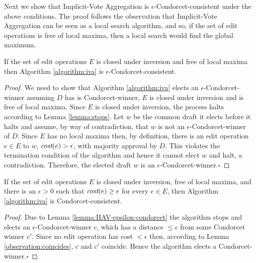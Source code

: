 \documentclass[sigconf]{aamas}  %
\newcommand{\qqed}{\hfill$\square$}
\newcommand{\cost}{\emph{cost}}
\begin{document}
Next we show that Implicit-Vote Aggregation is $\epsilon$-Condorcet-consistent under the above conditions. The proof follows the observation that Implicit-Vote Aggregation can be seen as a local search algorithm, and so, if the set of edit operations is free of local maxima, then a local search would find the global maximum.

\begin{lemma}\label{lemma:IIAV-epsilon-condorcet}
If the set of edit operations $E$ is closed under inversion and free of local maxima then Algorithm \ref{algorithm:iva} is $\epsilon$-Condorcet-consistent.
\end{lemma}

\begin{proof}
%
We need to show that Algorithm \ref{algorithm:iva} elects an $\epsilon$-Condorcet-winner assuming $D$ has is Condorcet-winner,  $E$ is closed under inversion and is free of local maxima.
Since $E$ is closed under inversion, the process halts according to Lemma \ref{lemma:stops}.  Let $w$ be the common draft it elects before it halts and assume, by way of contradiction, that $w$ is not an $\epsilon$-Condorcet-winner of $D$.  Since $E$ has no local maxima then, by definition, there is an edit operation $e \in E$ to $w$, $\cost(e) > \epsilon$, with majority approval by $D$.  This violates the termination condition of the algorithm and hence it cannot elect $w$ and halt, a contradiction.   Therefore, the elected draft $w$ is an $\epsilon$-Condorcet-winner.\qqed
%
\end{proof}

\begin{corollary}\label{corollary:IIAV--condorcet}
If the set of edit operations $E$ is closed under inversion, free of local maxima, and there is an $\epsilon > 0$ such that $\cost(e) \ge \epsilon$ for every $e \in E$, then Algorithm \ref{algorithm:iva} is Condorcet-consistent.
\end{corollary}

\begin{proof}
%
Due to Lemma \ref{lemma:IIAV-epsilon-condorcet} the algorithm stops and elects an $\epsilon$-Condorcet-winner $c$, which has a distance $\le \epsilon$ from some Condorcet winner $c'$.
Since no edit operation has cost $< \epsilon$ then, according to Lemma \ref{observation:coincides}, $c$ and $c'$ coincide.  Hence the algorithm elects a Condorcet-winner.\qqed
%
\end{proof}
\end{document}
